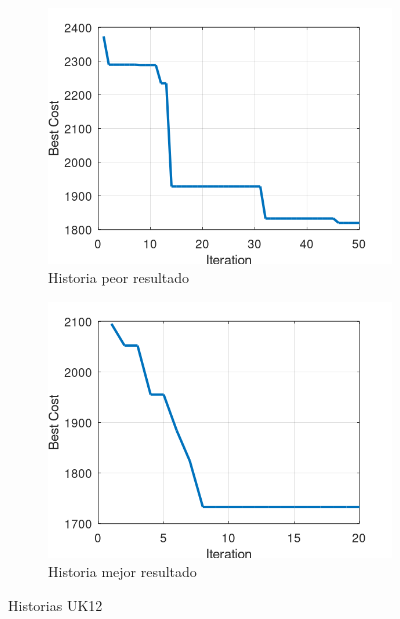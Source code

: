 \documentclass[12pt, a4paper]{article}
\begin{document}
\begin{figure}[H]
    \centering
    \begin{subfigure}[b]{0.45\textwidth}
        \centering
        \includegraphics[width=\textwidth]{img/uk12-worst-history.png}
        \caption{Historia peor resultado}
        \label{fig:uk12-worst-history}
    \end{subfigure}
    \hfill
    \begin{subfigure}[b]{0.45\textwidth}
        \centering
        \includegraphics[width=\textwidth]{img/uk12-best-history.png}
        \caption{Historia mejor resultado}
        \label{fig:uk12-best-history}
    \end{subfigure}
    \caption{Historias UK12}
    \label{fig:uk12-histories}
\end{figure}
\end{document}
